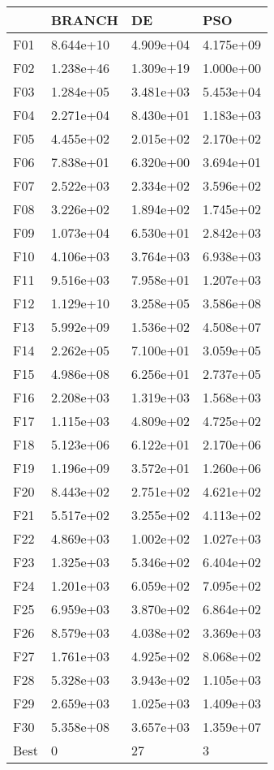 \begin{tabular}{llll}
\toprule
{} &     BRANCH &         DE &        PSO \\
\midrule
F01  &  8.644e+10 &  4.909e+04 &  4.175e+09 \\
F02  &  1.238e+46 &  1.309e+19 &  1.000e+00 \\
F03  &  1.284e+05 &  3.481e+03 &  5.453e+04 \\
F04  &  2.271e+04 &  8.430e+01 &  1.183e+03 \\
F05  &  4.455e+02 &  2.015e+02 &  2.170e+02 \\
F06  &  7.838e+01 &  6.320e+00 &  3.694e+01 \\
F07  &  2.522e+03 &  2.334e+02 &  3.596e+02 \\
F08  &  3.226e+02 &  1.894e+02 &  1.745e+02 \\
F09  &  1.073e+04 &  6.530e+01 &  2.842e+03 \\
F10  &  4.106e+03 &  3.764e+03 &  6.938e+03 \\
F11  &  9.516e+03 &  7.958e+01 &  1.207e+03 \\
F12  &  1.129e+10 &  3.258e+05 &  3.586e+08 \\
F13  &  5.992e+09 &  1.536e+02 &  4.508e+07 \\
F14  &  2.262e+05 &  7.100e+01 &  3.059e+05 \\
F15  &  4.986e+08 &  6.256e+01 &  2.737e+05 \\
F16  &  2.208e+03 &  1.319e+03 &  1.568e+03 \\
F17  &  1.115e+03 &  4.809e+02 &  4.725e+02 \\
F18  &  5.123e+06 &  6.122e+01 &  2.170e+06 \\
F19  &  1.196e+09 &  3.572e+01 &  1.260e+06 \\
F20  &  8.443e+02 &  2.751e+02 &  4.621e+02 \\
F21  &  5.517e+02 &  3.255e+02 &  4.113e+02 \\
F22  &  4.869e+03 &  1.002e+02 &  1.027e+03 \\
F23  &  1.325e+03 &  5.346e+02 &  6.404e+02 \\
F24  &  1.201e+03 &  6.059e+02 &  7.095e+02 \\
F25  &  6.959e+03 &  3.870e+02 &  6.864e+02 \\
F26  &  8.579e+03 &  4.038e+02 &  3.369e+03 \\
F27  &  1.761e+03 &  4.925e+02 &  8.068e+02 \\
F28  &  5.328e+03 &  3.943e+02 &  1.105e+03 \\
F29  &  2.659e+03 &  1.025e+03 &  1.409e+03 \\
F30  &  5.358e+08 &  3.657e+03 &  1.359e+07 \\
Best &          0 &         27 &          3 \\
\bottomrule
\end{tabular}

